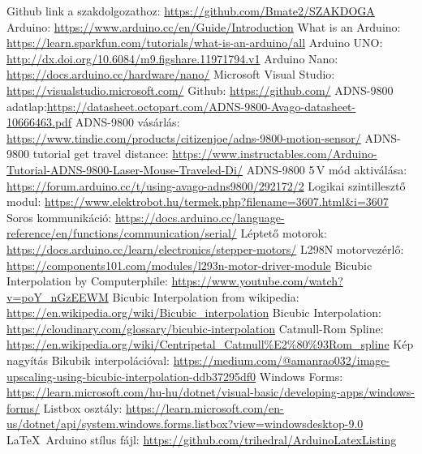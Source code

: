 \documentclass[]{thesis-ekf}
\theoremstyle{definition}
\theoremstyle{remark}
\begin{document}
\begin{thebibliography}{9}
 Github link a szakdolgozathoz: \url{https://github.com/Bmate2/SZAKDOGA}
 Arduino: \url{https://www.arduino.cc/en/Guide/Introduction}
 What is an Arduino: \url{https://learn.sparkfun.com/tutorials/what-is-an-arduino/all}
 Arduino UNO: \url{http://dx.doi.org/10.6084/m9.figshare.11971794.v1}
 Arduino Nano: \url{https://docs.arduino.cc/hardware/nano/}
 Microsoft Visual Studio: \url{https://visualstudio.microsoft.com/}
 Github: \url{https://github.com/}
 ADNS-9800 adatlap:\url{https://datasheet.octopart.com/ADNS-9800-Avago-datasheet-10666463.pdf}
 ADNS-9800 vásárlás: \url{https://www.tindie.com/products/citizenjoe/adns-9800-motion-sensor/}
 ADNS-9800 tutorial get travel distance: \url{https://www.instructables.com/Arduino-Tutorial-ADNS-9800-Laser-Mouse-Traveled-Di/}
 ADNS-9800 5\,V mód aktiválása: \url{https://forum.arduino.cc/t/using-avago-adns9800/292172/2}
 Logikai szintillesztő modul: \url{https://www.elektrobot.hu/termek.php?filename=3607.html&i=3607}
 Soros kommunikáció: \url{https://docs.arduino.cc/language-reference/en/functions/communication/serial/}
 Léptető motorok: \url{https://docs.arduino.cc/learn/electronics/stepper-motors/}
 L298N motorvezérlő: \url{https://components101.com/modules/l293n-motor-driver-module}
 Bicubic Interpolation by Computerphile: \url{https://www.youtube.com/watch?v=poY_nGzEEWM}
 Bicubic Interpolation from wikipedia: \url{https://en.wikipedia.org/wiki/Bicubic_interpolation}
 Bicubic Interpolation: \url{https://cloudinary.com/glossary/bicubic-interpolation}
 Catmull-Rom Spline: \url{https://en.wikipedia.org/wiki/Centripetal_Catmull%E2%80%93Rom_spline}
 Kép nagyítás Bikubik interpolációval: \url{https://medium.com/@amanrao032/image-upscaling-using-bicubic-interpolation-ddb37295df0}
 Windows Forms: \url{https://learn.microsoft.com/hu-hu/dotnet/visual-basic/developing-apps/windows-forms/}
 Listbox osztály: \url{https://learn.microsoft.com/en-us/dotnet/api/system.windows.forms.listbox?view=windowsdesktop-9.0}
 \LaTeX\ Arduino stílus fájl: \url{https://github.com/trihedral/ArduinoLatexListing}

\end{thebibliography}
\end{document}
